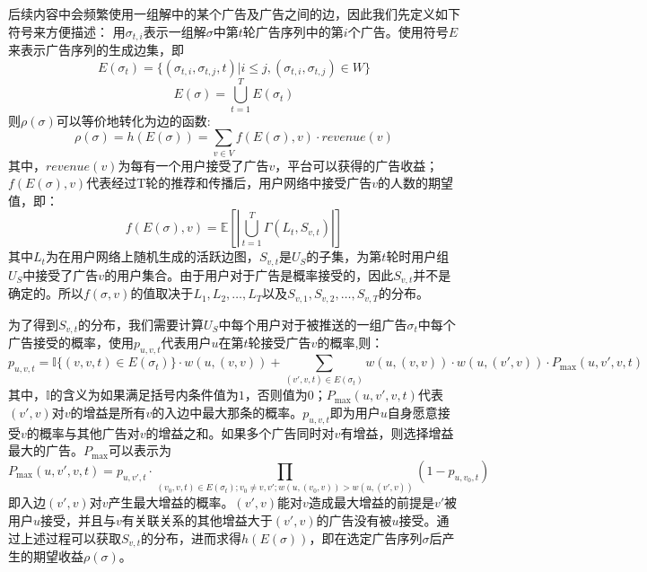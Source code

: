 后续内容中会频繁使用一组解中的某个广告及广告之间的边，因此我们先定义如下符号来方便描述：
用$\sigma_{t,i}$表示一组解$\sigma$中第$t$轮广告序列中的第$i$个广告。使用符号$E$来表示广告序列的生成边集，即
\begin{equation}
E(\sigma_t)=\{(\sigma_{t,i},\sigma_{t,j},t)|i \le j, (\sigma_{t,i},\sigma_{t,j})\in W\}
\end{equation}
\begin{equation}
E(\sigma)= \bigcup_{t=1}^T E(\sigma_t)
\end{equation}
\noindent 则$\rho(\sigma)$可以等价地转化为边的函数:
\begin{equation}
\label{equ:def_h}
\rho(\sigma) = h(E(\sigma)) = \sum_{v\in V}f(E(\sigma),v)\cdot revenue(v) 
\end{equation}
\noindent 其中，$revenue(v)$为每有一个用户接受了广告$v$，平台可以获得的广告收益；$f(E(\sigma),v)$代表经过T轮的推荐和传播后，用户网络中接受广告$v$的人数的期望值，即：
\begin{equation}
f(E(\sigma),v)=\mathbb{E}[|\bigcup_{t=1}^T\Gamma(L_t,S_{v,t})|]
\end{equation}
\noindent 其中$L_t$为在用户网络上随机生成的活跃边图，$S_{v,t}$是$U_S$的子集，为第$t$轮时用户组$U_S$中接受了广告$v$的用户集合。由于用户对于广告是概率接受的，因此$S_{v,t}$并不是确定的。所以$f(\sigma,v)$的值取决于$L_1,L_2,\ldots,L_T$以及$S_{v,1},S_{v,2},\ldots,S_{v,T}$的分布。

为了得到$S_{v,t}$的分布，我们需要计算$U_S$中每个用户对于被推送的一组广告$\sigma_t$中每个广告接受的概率，使用$p_{u,v,t}$代表用户$u$在第$t$轮接受广告$v$的概率,则\label{sec:puvt}：
\begin{equation}
p_{u,v,t}=\mathbb{I}\{(v,v,t)\in E(\sigma_t)\}\cdot w(u,(v,v)) + \sum_{(v',v,t)\in E(\sigma_t)}w(u,(v,v))\cdot w(u,(v',v))\cdot P_{\max}(u,v',v,t)
\end{equation}
\noindent 其中，$\mathbb{I}$的含义为如果满足括号内条件值为$1$，否则值为$0$；$P_{\max}(u,v',v,t)$代表$(v',v)$对$v$的增益是所有$v$的入边中最大那条的概率。$p_{u,v,t}$即为用户$u$自身愿意接受$v$的概率与其他广告对$v$的增益之和。如果多个广告同时对$v$有增益，则选择增益最大的广告。$P_{\max}$可以表示为
\begin{equation}
    P_{\max}(u,v',v,t)=p_{u,v',t}\cdot \prod_{(v_0,v,t)\in E(\sigma_t);v_0\neq v,v';w(u,(v_0,v))>w(u,(v',v))}(1-p_{u,v_0,t})
\end{equation}
\noindent 即入边$(v',v)$对$v$产生最大增益的概率。$(v',v)$能对$v$造成最大增益的前提是$v'$被用户$u$接受，并且与$v$有关联关系的其他增益大于$(v',v)$的广告没有被$u$接受。通过上述过程可以获取$S_{v,t}$的分布，进而求得$h(E(\sigma))$，即在选定广告序列$\sigma$后产生的期望收益$\rho(\sigma)$。


